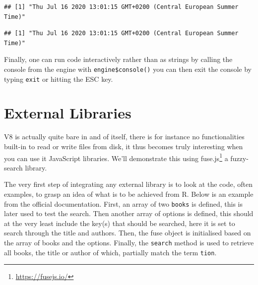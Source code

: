 \documentclass[
]{krantz}
\makeatletter
\newenvironment{Shaded}{\begin{snugshade}}{\end{snugshade}}
\newcommand{\CommentTok}[1]{\textcolor[rgb]{0.37,0.37,0.37}{\textit{#1}}}
\newcommand{\KeywordTok}[1]{\textcolor[rgb]{0.27,0.27,0.27}{\textbf{#1}}}
\newcommand{\NormalTok}[1]{#1}
\newcommand{\OperatorTok}[1]{\textcolor[rgb]{0.43,0.43,0.43}{\textbf{#1}}}
\newcommand{\StringTok}[1]{\textcolor[rgb]{0.5,0.5,0.5}{#1}}
\renewcommand{\href}[2]{#2\footnote{\url{#1}}}
\newenvironment{kframe}{%
\medskip{}
\setlength{\fboxsep}{.8em}
 \def\at@end@of@kframe{}%
 \ifinner\ifhmode%
  \def\at@end@of@kframe{\end{minipage}}%
  \begin{minipage}{\columnwidth}%
 \fi\fi%
 \def\FrameCommand##1{\hskip\@totalleftmargin \hskip-\fboxsep
 \colorbox{shadecolor}{##1}\hskip-\fboxsep
     \hskip-\linewidth \hskip-\@totalleftmargin \hskip\columnwidth}%
 \MakeFramed {\advance\hsize-\width
   \@totalleftmargin\z@ \linewidth\hsize
   \@setminipage}}%
 {\par\unskip\endMakeFramed%
 \at@end@of@kframe}
\renewenvironment{Shaded}{\begin{kframe}}{\end{kframe}}
\makeatother
\begin{document}
\begin{Shaded}
\end{Shaded}

\begin{verbatim}
## [1] "Thu Jul 16 2020 13:01:15 GMT+0200 (Central European Summer Time)"
\end{verbatim}

\begin{Shaded}
\end{Shaded}

\begin{verbatim}
## [1] "Thu Jul 16 2020 13:01:15 GMT+0200 (Central European Summer Time)"
\end{verbatim}

Finally, one can run code interactively rather than as strings by calling the console from the engine with \texttt{engine\$console()} you can then exit the console by typing \texttt{exit} or hitting the ESC key.

\hypertarget{external-libraries}{%
\section*{External Libraries}\label{external-libraries}}


V8 is actually quite bare in and of itself, there is for instance no functionalities built-in to read or write files from disk, it thus becomes truly interesting when you can use it JavaScript libraries. We'll demonstrate this using \href{https://fusejs.io/}{fuse.js} a fuzzy-search library.

The very first step of integrating any external library is to look at the code, often examples, to grasp an idea of what is to be achieved from R. Below is an example from the official documentation. First, an array of two \texttt{books} is defined, this is later used to test the search. Then another array of options is defined, this should at the very least include the key(s) that should be searched, here it is set to search through the title and authors. Then, the fuse object is initialised based on the array of books and the options. Finally, the \texttt{search} method is used to retrieve all books, the title or author of which, partially match the term \texttt{tion}.
\end{document}
